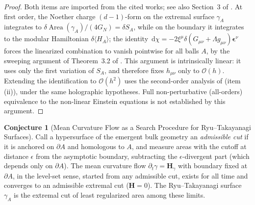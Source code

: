 \documentclass[11pt,a4paper,reqno]{amsart}
\theoremstyle{definition}
\newtheorem{conjecture}[theorem]{Conjecture}
\numberwithin{equation}{section}
\providecommand{\Area}{\operatorname{Area}}
\newcommand{\dif}{\,\mathrm{d}}
\providecommand{\Area}{\mathrm{Area}}
\begin{document}
\begin{proof}
Both items are imported from the cited works; see also Section~3 of \cite{silvafilho2026spacetime}. At first order, the Noether charge $(d-1)$-form on the extremal surface $\gamma_A$ integrates to $\delta \Area(\gamma_A)/(4G_N) = \delta S_A$, while on the boundary it integrates to the modular Hamiltonian $\delta\langle H_A\rangle$; the identity $\dif\chi = -2\xi^\mu \delta(G_{\mu\nu} + \Lambda g_{\mu\nu})\mathbf{\epsilon}^\nu$ forces the linearized combination to vanish pointwise for all balls $A$, by the sweeping argument of Theorem~3.2 of \cite{silvafilho2026spacetime}. This argument is intrinsically linear: it uses only the first variation of $S_A$, and therefore fixes $h_{\mu\nu}$ only to $\mathcal{O}(h)$. Extending the identification to $\mathcal{O}(h^2)$ uses the second-order analysis of \cite{faulkner2017nonlinear} (item (ii)), under the same holographic hypotheses. Full non-perturbative (all-orders) equivalence to the non-linear Einstein equations is not established by this argument.
\end{proof}

\begin{conjecture}[Mean Curvature Flow as a Search Procedure for Ryu--Takayanagi Surfaces]
\label{thm:rt_mcf_convergence}
Call a hypersurface of the emergent bulk geometry an \emph{admissible cut} if it is anchored on $\partial A$ and homologous to $A$, and measure areas with the cutoff at distance $\epsilon$ from the asymptotic boundary, subtracting the $\epsilon$-divergent part (which depends only on $\partial A$). The mean curvature flow $\partial_t \gamma = \mathbf{H}_\gamma$ with boundary fixed at $\partial A$, in the level-set sense, started from any admissible cut, exists for all time and converges to an admissible extremal cut ($\mathbf{H} = 0$). The Ryu--Takayanagi surface $\gamma_A$ \cite{ryu2006holographic} is the extremal cut of least regularized area among these limits.
\end{conjecture}
\end{document}
